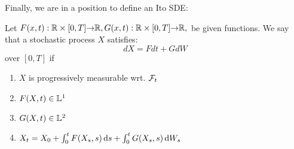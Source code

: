 Finally, we are in a position to define an Ito SDE:

\begin{defn} Let
$F(x,t):{ \mathbb{R} }\times [0,T]{\rightarrow} { \mathbb{R} },  G(x,t):{ \mathbb{R} }\times [0,T]{\rightarrow} { \mathbb{R} },$ be given functions.
We say that a stochastic process $X$ satisfies:
\begin{equation}
dX =F dt + G dW
\end{equation} 
over $[0,T]$ if
\begin{enumerate}
  \item $X$ is progressively measurable wrt. ${\mathcal{F}}_t$
  \item $F(X,t) \in {\mathbb{L}^1}$
  \item $G(X,t) \in {\mathbb{L}^2}$ 
  \item $X_t = X_0 + \int_0^t F(X_s, s) \, \mathrm{d} s + \int_0^t G(X_s, s) \, \mathrm{d} W_s$
\end{enumerate}
\end{defn}


